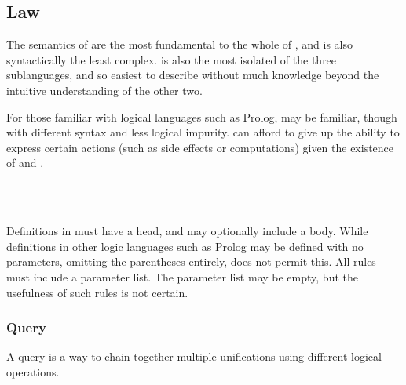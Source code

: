 \subsection{Law}

The semantics of \Law{} are the most fundamental to the whole of \Trilogy{}, and
\Law{} is also syntactically the least complex. \Law{} is also the most isolated
of the three sublanguages, and so easiest to describe without much knowledge beyond
the intuitive understanding of the other two.


For those familiar with logical languages such as Prolog, \Law{} may be
familiar, though with different syntax and less logical impurity. \Law{} can
afford to give up the ability to express certain actions (such as side effects
or computations) given the existence of \Prose{} and \Poetry{}.

\begin{bnf*}
     \\
     \\
\end{bnf*}

Definitions in \Law{} must have a head, and may optionally include a body. While
definitions in other logic languages such as Prolog may be defined with no parameters,
omitting the parentheses entirely, \Law{} does not permit this. All rules must include
a parameter list. The parameter list may be empty, but the usefulness of such rules
is not certain.

\subsubsection{Query}

A query is a way to chain together multiple unifications using different
logical operations.

\begin{bnf*}
     \\
\end{bnf*}

